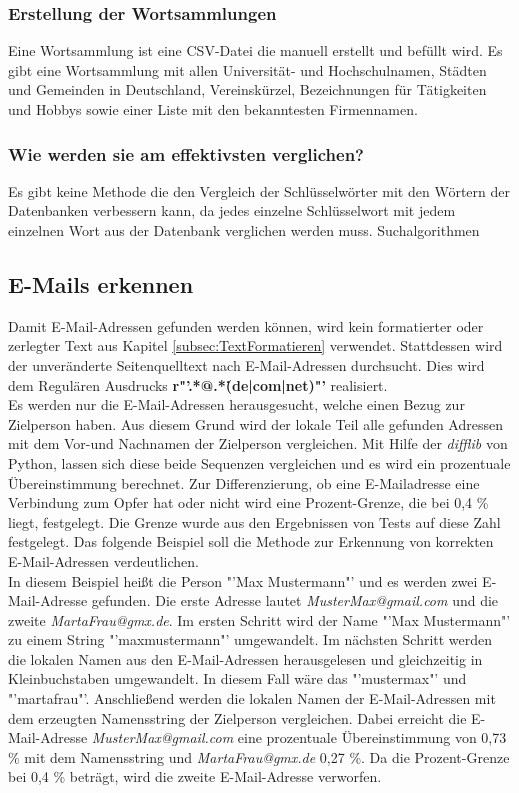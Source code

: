 		\subsubsection{Erstellung der Wortsammlungen}	
		Eine Wortsammlung ist eine CSV-Datei die manuell erstellt und befüllt wird. Es gibt eine Wortsammlung mit allen Universität- und Hochschulnamen, Städten und Gemeinden in Deutschland, Vereinskürzel, Bezeichnungen für Tätigkeiten und Hobbys sowie einer Liste mit den bekanntesten Firmennamen. 
		\subsubsection{Wie werden sie am effektivsten verglichen?}
		Es gibt keine Methode die den Vergleich der Schlüsselwörter mit den Wörtern der Datenbanken verbessern kann, da jedes einzelne Schlüsselwort mit jedem einzelnen Wort aus der Datenbank verglichen werden muss. Suchalgorithmen
		
	\subsection{E-Mails erkennen}
	Damit E-Mail-Adressen gefunden werden können, wird kein formatierter oder zerlegter Text aus Kapitel \ref{subsec:TextFormatieren} verwendet. Stattdessen wird der unveränderte Seitenquelltext nach E-Mail-Adressen durchsucht. Dies wird dem  Regulären Ausdrucks \textbf{r"'.*@.*\.(de|com|net)"'} realisiert.\\
	Es werden nur die E-Mail-Adressen herausgesucht, welche einen Bezug zur Zielperson haben. Aus diesem Grund wird der lokale Teil alle gefunden Adressen mit dem Vor-und Nachnamen der Zielperson vergleichen. Mit Hilfe der \textit{difflib} von Python, lassen sich diese beide Sequenzen vergleichen und es wird ein prozentuale Übereinstimmung berechnet. Zur Differenzierung, ob eine E-Mailadresse eine Verbindung zum Opfer hat oder nicht wird eine Prozent-Grenze, die bei 0,4 \% liegt, festgelegt. Die Grenze wurde aus den Ergebnissen von Tests auf diese Zahl festgelegt. Das folgende Beispiel soll die Methode zur Erkennung von korrekten E-Mail-Adressen verdeutlichen.\\
	In diesem Beispiel heißt die Person "'Max Mustermann"' und es werden zwei E-Mail-Adresse gefunden. Die erste Adresse lautet \textit{MusterMax@gmail.com} und die zweite \textit{MartaFrau@gmx.de}. Im ersten Schritt wird der Name "'Max Mustermann"' zu einem String "'maxmustermann"' umgewandelt. Im nächsten Schritt werden die lokalen Namen aus den E-Mail-Adressen herausgelesen und gleichzeitig in Kleinbuchstaben umgewandelt. In diesem Fall wäre das "'mustermax"' und "'martafrau"'. Anschließend werden die lokalen Namen der E-Mail-Adressen mit dem erzeugten Namensstring der Zielperson vergleichen. Dabei erreicht die E-Mail-Adresse \textit{MusterMax@gmail.com} eine prozentuale Übereinstimmung von 0,73 \% mit dem Namensstring und \textit{MartaFrau@gmx.de} 0,27 \%. Da die Prozent-Grenze bei 0,4 \% beträgt, wird die zweite E-Mail-Adresse verworfen.
		
